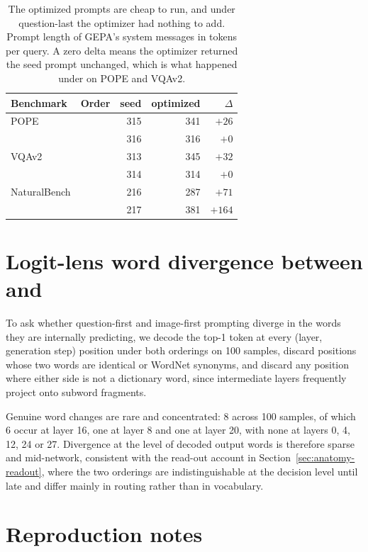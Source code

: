 \begin{table}[h]
\caption{The optimized prompts are cheap to run, and under question-last the
optimizer had nothing to add. Prompt length of GEPA's system messages in tokens
per query. A zero delta means the optimizer returned the seed prompt unchanged,
which is what happened under \sit{} on POPE and VQAv2.}
\label{tab:gepa-tokens}
\begin{center}
\begin{tabular}{llrrr}
\toprule
Benchmark & Order & seed & optimized & $\Delta$ \\
\midrule
POPE         & \sti{} & 315 & 341 & $+26$ \\
             & \sit{} & 316 & 316 & $+0$ \\
VQAv2        & \sti{} & 313 & 345 & $+32$ \\
             & \sit{} & 314 & 314 & $+0$ \\
NaturalBench & \sti{} & 216 & 287 & $+71$ \\
             & \sit{} & 217 & 381 & $+164$ \\
\bottomrule
\end{tabular}
\end{center}
\end{table}

\section{Logit-lens word divergence between \sti{} and \ist{}}
\label{app:worddiff}

To ask whether question-first and image-first prompting diverge in the words they
are internally predicting, we decode the top-1 token at every (layer, generation
step) position under both orderings on 100 samples, discard positions whose two
words are identical or WordNet synonyms, and discard any position where either
side is not a dictionary word, since intermediate layers frequently project onto
subword fragments.

Genuine word changes are rare and concentrated: $8$ across 100 samples, of which
$6$ occur at layer 16, one at layer 8 and one at layer 20, with none at layers
0, 4, 12, 24 or 27. Divergence at the level of decoded output words is therefore
sparse and mid-network, consistent with the read-out account in
Section~\ref{sec:anatomy-readout}, where the two orderings are indistinguishable
at the decision level until late and differ mainly in routing rather than in
vocabulary.

\section{Reproduction notes}
\label{app:repro}

